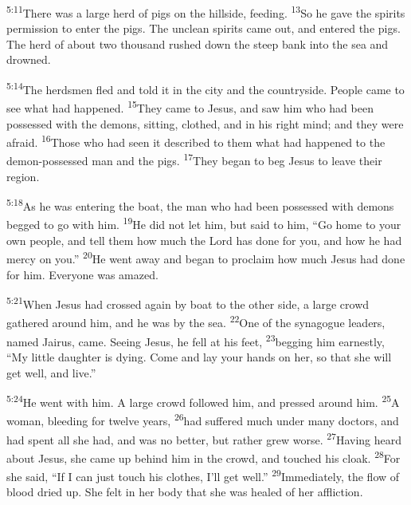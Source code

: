 \documentclass[openany,12pt,english]{book}
\newenvironment{para}{\par\pretolerance=100\tolerance=200\setlength{\emergencystretch}{0.6em}\relax}{\par}
\begin{document}
\begin{para}
    \textsuperscript{5:11}\thinspace{}There was a large herd of pigs on the hill\-side, feed\-ing.
    \textsuperscript{13}\thinspace{}So he gave the spirits per\-mis\-sion to en\-ter the pigs. The un\-clean spirits came out, and entered the pigs. The herd of a\-bout two thou\-sand rushed down the steep bank in\-to the sea and drowned.
\end{para}

\begin{para}
    \textsuperscript{5:14}\thinspace{}The herdsmen fled and told it in the cit\-y and the coun\-try\-side. Peo\-ple came to see what had happened.
    \textsuperscript{15}\thinspace{}They came to Jesus, and saw him who had been pos\-sessed with the demons, sit\-ting, clothed, and in his right mind; and they were a\-fraid.
    \textsuperscript{16}\thinspace{}Those who had seen it de\-scribed to them what had happened to the demon-possessed man and the pigs.
    \textsuperscript{17}\thinspace{}They be\-gan to beg Jesus to leave their re\-gion.
\end{para}

\begin{para}
    \textsuperscript{5:18}\thinspace{}As he was entering the boat, the man who had been pos\-sessed with demons begged to go with him.
    \textsuperscript{19}\thinspace{}He did not let him, but said to him, “Go home to your own peo\-ple, and tell them how much the Lord has done for you, and how he had mer\-cy on you.”
    \textsuperscript{20}\thinspace{}He went a\-way and be\-gan to pro\-claim how much Jesus had done for him. Eve\-ry\-one was a\-mazed.
\end{para}

\bigskip{}

\begin{para}
    \textsuperscript{5:21}\thinspace{}When Jesus had crossed again by boat to the oth\-er side, a large crowd gathered a\-round him, and he was by the sea.
    \textsuperscript{22}\thinspace{}One of the syn\-a\-gogue leaders, named Jairus, came. See\-ing Jesus, he fell at his feet,
    \textsuperscript{23}\thinspace{}begging him ear\-nest\-ly, “My lit\-tle daugh\-ter is dy\-ing. Come and lay your hands on her, so that she will get well, and live.”
\end{para}

\begin{para}
    \textsuperscript{5:24}\thinspace{}He went with him. A large crowd followed him, and pressed a\-round him.
    \textsuperscript{25}\thinspace{}A wom\-an, bleed\-ing for twelve years,
    \textsuperscript{26}\thinspace{}had suffered much un\-der man\-y doctors, and had spent all she had, and was no bet\-ter, but rath\-er grew worse.
    \textsuperscript{27}\thinspace{}Hav\-ing heard a\-bout Jesus, she came up be\-hind him in the crowd, and touched his cloak.
    \textsuperscript{28}\thinspace{}For she said, “If I can just tou\-ch his clothes, I'll get well.”
    \textsuperscript{29}\thinspace{}Im\-me\-di\-ate\-ly, the flow of blood dried up. She felt in her bod\-y that she was healed of her af\-flic\-tion.
\end{para}
\end{document}
